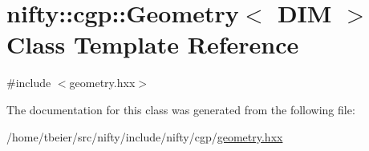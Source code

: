 \hypertarget{classnifty_1_1cgp_1_1Geometry}{}\section{nifty\+:\+:cgp\+:\+:Geometry$<$ D\+I\+M $>$ Class Template Reference}
\label{classnifty_1_1cgp_1_1Geometry}


{\ttfamily \#include $<$geometry.\+hxx$>$}



The documentation for this class was generated from the following file\+:\begin{DoxyCompactItemize}
\item 
/home/tbeier/src/nifty/include/nifty/cgp/\hyperlink{geometry_8hxx}{geometry.\+hxx}\end{DoxyCompactItemize}
